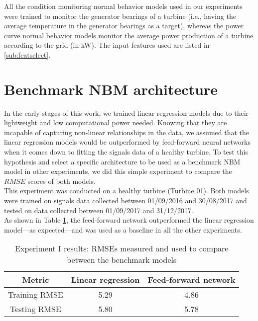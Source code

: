 All the condition monitoring normal behavior models used in our experiments were trained to monitor the generator bearings of a turbine (i.e., having the average temperature in the generator bearings 
as a target), whereas the power curve normal behavior models monitor the average power production of a turbine according to the grid (in kW). The input features used are listed in \ref{sub:featselect}.

\section{Benchmark NBM architecture}
\label{exp:I}

In the early stages of this work, we trained linear regression models due to their lightweight and low computational power needed. Knowing that they are incapable of capturing non-linear
relationships in the data, we assumed that the linear regression models would be outperformed by feed-forward neural networks when it comes down to fitting the 
signals data of a healthy turbine. To test this hypothesis and select a specific architecture to be used as a benchmark NBM model in other experiments, we did this simple experiment 
to compare the $RMSE$ scores of both models.\\
This experiment was conducted on a healthy turbine (Turbine 01). Both models were trained on signals data collected between 01/09/2016 and 30/08/2017 and tested on data collected between
01/09/2017 and 31/12/2017.\\
As shown in Table \ref{tab:Experiment I results}, the feed-forward network outperformed the linear regression model---as expected---and was used as a baseline in all the other experiments.
\begin{table}[H]
        \centering
    \begin{tabular}{|c|c|c|}
    \hline
         \textbf{Metric} & \textbf{Linear regression} & \textbf{Feed-forward network}\\
         \hline
         Training RMSE & 5.29 & 4.86\\
         \hline
         Testing RMSE & 5.80 & 5.78 \\
    \hline
    \end{tabular}
    \caption{Experiment I results: RMSEs measured and used to compare between the benchmark models}
        \label{tab:Experiment I results}
\end{table}


